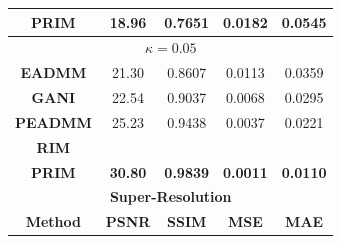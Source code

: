 \documentclass[conference]{IEEEtran}
\begin{document}
\begin{table}[b!]
\begin{tabular}{|ccccc|}
\multicolumn{1}{|c|}{\textbf{PRIM}}   & \multicolumn{1}{c|}{\cellcolor[HTML]{E2EFDA}\textbf{18.96}} & \multicolumn{1}{c|}{\cellcolor[HTML]{E2EFDA}\textbf{0.7651}} & \multicolumn{1}{c|}{\cellcolor[HTML]{E2EFDA}\textbf{0.0182}} & \cellcolor[HTML]{E2EFDA}\textbf{0.0545} \\ \hline
\multicolumn{5}{|c|}{\textbf{$\kappa = 0.05$}}                                                                                                                                                                                                                              \\ \hline
\multicolumn{1}{|c|}{\textbf{EADMM}}                          & \multicolumn{1}{c|}{21.30}                                  & \multicolumn{1}{c|}{0.8607}                                  & \multicolumn{1}{c|}{0.0113}                                  & 0.0359          \\ \hline
\multicolumn{1}{|c|}{\textbf{GANI}}                           & \multicolumn{1}{c|}{22.54}                                  & \multicolumn{1}{c|}{0.9037}                                  & \multicolumn{1}{c|}{0.0068}                                  & 0.0295          \\ \hline
\multicolumn{1}{|c|}{\textbf{PEADMM}} & \multicolumn{1}{c|}{25.23}          & \multicolumn{1}{c|}{0.9438}    & \multicolumn{1}{c|}{0.0037}          & 0.0221          \\ \hline
\multicolumn{1}{|c|}{\textbf{RIM}}    & \multicolumn{1}{c|}{\cellcolor[HTML]{DDEBF7}{\ul 30.29}}    & \multicolumn{1}{c|}{\cellcolor[HTML]{DDEBF7}{\ul 0.9802}}          & \multicolumn{1}{c|}{\cellcolor[HTML]{DDEBF7}{\ul 0.0012}}    & \cellcolor[HTML]{DDEBF7}{\ul 0.0119}    \\ \hline
\multicolumn{1}{|c|}{\textbf{PRIM}}   & \multicolumn{1}{c|}{\cellcolor[HTML]{E2EFDA}\textbf{30.80}} & \multicolumn{1}{c|}{\cellcolor[HTML]{E2EFDA}\textbf{0.9839}} & \multicolumn{1}{c|}{\cellcolor[HTML]{E2EFDA}\textbf{0.0011}} & \cellcolor[HTML]{E2EFDA}\textbf{0.0110} \\ \hline
\multicolumn{5}{|c|}{\textbf{Super-Resolution}}                                                                                                                                                                                                                             \\ \hline
\multicolumn{1}{|c|}{\textbf{Method}}                         & \multicolumn{1}{c|}{\textbf{PSNR}}                          & \multicolumn{1}{c|}{\textbf{SSIM}}                           & \multicolumn{1}{c|}{\textbf{MSE}}                            & \textbf{MAE}    \\ \hline

\end{tabular}
\end{table}
\end{document}
